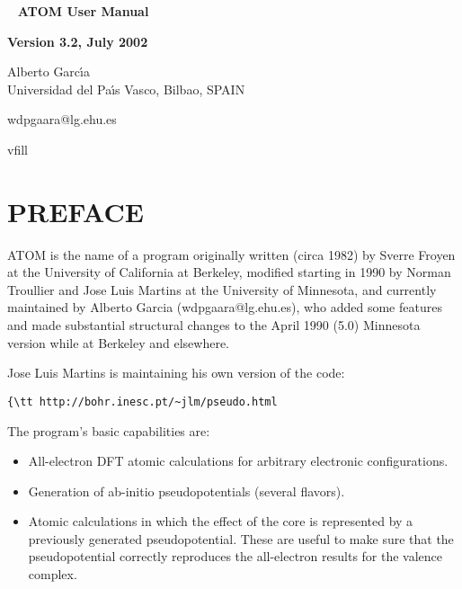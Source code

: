 \documentclass[11pt]{article}
\begin{document}

\begin{titlepage}

\begin{center}
~
\vfill
\vspace{1cm}
{\Huge {\bf ATOM User Manual}}
\par\vspace{3cm}
\hrulefill
\par\vspace{3cm}
{\Large {\bf Version 3.2, July 2002}}
\par\vspace{2cm}
\hrulefill

{\Large Alberto Garc\'{\i}a \\
 Universidad del Pa\'{\i}s Vasco, Bilbao, SPAIN 

  wdpgaara@lg.ehu.es}
vfill
\end{center}

\end{titlepage}

\tableofcontents
\newpage

\section{PREFACE}

{\sc ATOM} is the name of a program originally written (circa 1982) by
Sverre Froyen at the University of California at Berkeley, modified
starting in 1990 by Norman Troullier and Jose Luis Martins at the
University of Minnesota, and currently maintained by Alberto Garcia
(wdpgaara@lg.ehu.es), who added some features and made substantial
structural changes to the April 1990 (5.0) Minnesota version while at
Berkeley and elsewhere.

Jose Luis Martins is maintaining his own version of the code:
\begin{verbatim}{\tt http://bohr.inesc.pt/~jlm/pseudo.html\end{verbatim}


The program's basic capabilities are:

\begin{itemize}
\item All-electron DFT atomic calculations for arbitrary electronic
configurations.

\item Generation of ab-initio pseudopotentials (several flavors).

\item Atomic calculations in which the effect of the core is represented
by a previously generated pseudopotential. These are useful to make
sure that the pseudopotential correctly reproduces the all-electron
results for the valence complex.

\end{itemize}
\end{document}
